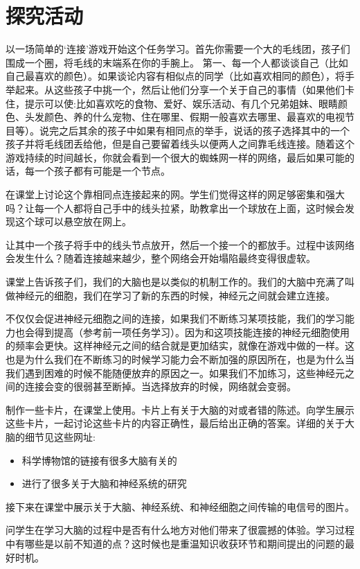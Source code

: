     
\section{探究活动}
    以一场简单的‘连接’游戏开始这个任务学习。首先你需要一个大的毛线团，孩子们围成一个圈，将毛线的末端系在你的手腕上。\pat
    第一、每一个人都谈谈自己（比如自己最喜欢的颜色）。如果谈论内容有相似点的同学（比如喜欢相同的颜色），将手举起来。从这些孩子中挑一个，然后让他们分享一个关于自己的事情（如果他们卡住，提示可以使:比如喜欢吃的食物、爱好、娱乐活动、有几个兄弟姐妹、眼睛颜色、头发颜色、养的什么宠物、住在哪里、假期一般喜欢去哪里、最喜欢的电视节目等）。说完之后其余的孩子中如果有相同点的举手，说话的孩子选择其中的一个孩子并将毛线团丢给他，但是自己要留着线头以便两人之间靠毛线连接。随着这个游戏持续的时间越长，你就会看到一个很大的蜘蛛网一样的网络，最后如果可能的话，每一个孩子都有可能是一个节点。\par
    在课堂上讨论这个靠相同点连接起来的网。学生们觉得这样的网足够密集和强大吗？让每一个人都将自己手中的线头拉紧，助教拿出一个球放在上面，这时候会发现这个球可以悬空放在网上。\par
    让其中一个孩子将手中的线头节点放开，然后一个接一个的都放手。过程中该网络会发生什么？随着连接越来越少，整个网络会开始塌陷最终变得很虚软。\par
    课堂上告诉孩子们，我们的大脑也是以类似的机制工作的。我们的大脑中充满了叫做神经元的细胞，我们在学习了新的东西的时候，神经元之间就会建立连接。\par
    不仅仅会促进神经元细胞之间的连接，如果我们不断练习某项技能，我们的学习能力也会得到提高（参考前一项任务学习）。因为和这项技能连接的神经元细胞使用的频率会更快。这样神经元之间的结合就是更加结实，就像在游戏中做的一样。这也是为什么我们在不断练习的时候学习能力会不断加强的原因所在，也是为什么当我们遇到困难的时候不能随便放弃的原因之一。如果我们不加练习，这些神经元之间的连接会变的很弱甚至断掉。当选择放弃的时候，网络就会变弱。\par
    制作一些卡片，在课堂上使用。卡片上有关于大脑的对或者错的陈述。向学生展示这些卡片，一起讨论这些卡片的内容正确性，最后给出正确的答案。详细的关于大脑的细节见这些网址:\par
    \begin{itemize}
      \item 科学博物馆的链接有很多大脑有关的
      \item {}进行了很多关于大脑和神经系统的研究
    \end{itemize}  
    接下来在课堂中展示关于大脑、神经系统、和神经细胞之间传输的电信号的图片。\par
    问学生在学习大脑的过程中是否有什么地方对他们带来了很震撼的体验。学习过程中有哪些是以前不知道的点？这时候也是重温知识收获环节和期间提出的问题的最好时机。

